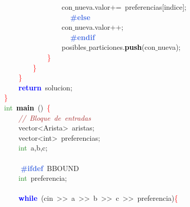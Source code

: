 \mbox{}\ \ \ \ \ \ \ \ \ \ \ \ \ \ \ \ con$\_$nueva\textcolor{BrickRed}{.}valor\textcolor{BrickRed}{+=}\ preferencias\textcolor{BrickRed}{[}indice\textcolor{BrickRed}{];} \\
\mbox{}\textbf{\textcolor{RoyalBlue}{\ \ \ \ \ \ \ \ \ \ \ \ \ \ \ \ \#else}} \\
\mbox{}\ \ \ \ \ \ \ \ \ \ \ \ \ \ \ \ con$\_$nueva\textcolor{BrickRed}{.}valor\textcolor{BrickRed}{++;} \\
\mbox{}\textbf{\textcolor{RoyalBlue}{\ \ \ \ \ \ \ \ \ \ \ \ \ \ \ \ \#endif}} \\
\mbox{}\ \ \ \ \ \ \ \ \ \ \ \ \ \ \ \ posibles$\_$particiones\textcolor{BrickRed}{.}\textbf{\textcolor{Black}{push}}\textcolor{BrickRed}{(}con$\_$nueva\textcolor{BrickRed}{);} \\
\mbox{}\ \ \ \ \ \ \ \ \ \ \ \ \textcolor{Red}{\}} \\
\mbox{}\ \ \ \ \ \ \ \ \textcolor{Red}{\}} \\
\mbox{}\ \ \ \ \textcolor{Red}{\}} \\
\mbox{}\ \ \ \ \textbf{\textcolor{Blue}{return}}\ solucion\textcolor{BrickRed}{;} \\
\mbox{}\textcolor{Red}{\}} \\
\mbox{}\textcolor{ForestGreen}{int}\ \textbf{\textcolor{Black}{main}}\ \textcolor{BrickRed}{()}\ \textcolor{Red}{\{} \\
\mbox{}\ \ \ \ \textit{\textcolor{Brown}{//\ Bloque\ de\ entradas}} \\
\mbox{}\ \ \ \ \textcolor{TealBlue}{vector\textless{}Arista\textgreater{}}\ aristas\textcolor{BrickRed}{;} \\
\mbox{}\ \ \ \ \textcolor{TealBlue}{vector\textless{}int\textgreater{}}\ preferencias\textcolor{BrickRed}{;} \\
\mbox{}\ \ \ \ \textcolor{ForestGreen}{int}\ a\textcolor{BrickRed}{,}b\textcolor{BrickRed}{,}c\textcolor{BrickRed}{;} \\
\mbox{} \\
\mbox{}\textbf{\textcolor{RoyalBlue}{\ \ \ \ \#ifdef}}\ BBOUND \\
\mbox{}\ \ \ \ \textcolor{ForestGreen}{int}\ preferencia\textcolor{BrickRed}{;} \\
\mbox{} \\
\mbox{}\ \ \ \ \textbf{\textcolor{Blue}{while}}\ \textcolor{BrickRed}{(}cin\ \textcolor{BrickRed}{\textgreater{}\textgreater{}}\ a\ \textcolor{BrickRed}{\textgreater{}\textgreater{}}\ b\ \textcolor{BrickRed}{\textgreater{}\textgreater{}}\ c\ \textcolor{BrickRed}{\textgreater{}\textgreater{}}\ preferencia\textcolor{BrickRed}{)}\textcolor{Red}{\{} \\
